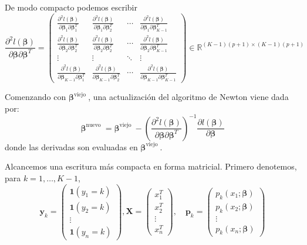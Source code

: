 \documentclass{report}
\begin{document}
  
  De modo compacto podemos escribir 
  $$
  \frac{\partial^2 l( \boldsymbol{\beta})}{\partial  \boldsymbol{\beta} \partial  \boldsymbol{\beta}^T}=\left(\begin{array}{cccc}
  	\frac{\partial^2 l( \boldsymbol{\beta})}{\partial  \boldsymbol{\beta}_1 \partial  \boldsymbol{\beta}_1^T} & \frac{\partial^2 l( \boldsymbol{\beta})}{\partial  \boldsymbol{\beta}_1 \partial  \boldsymbol{\beta}_2^T} & \cdots & \frac{\partial^2 l( \boldsymbol{\beta})}{\partial  \boldsymbol{\beta}_1 \partial  \boldsymbol{\beta}_{K-1}^T} \\
  	\frac{\partial^2 l( \boldsymbol{\beta})}{\partial  \boldsymbol{\beta}_2 \partial  \boldsymbol{\beta}_2^T} & \frac{\partial^2 l( \boldsymbol{\beta})}{\partial  \boldsymbol{\beta}_2 \partial  \boldsymbol{\beta}_2^T} & \cdots & \frac{\partial^2 l( \boldsymbol{\beta})}{\partial  \boldsymbol{\beta}_2 \partial  \boldsymbol{\beta}_{K-1}^T} \\
  	\vdots & \vdots & \ddots & \vdots \\
  	\frac{\partial^2 l( \boldsymbol{\beta})}{\partial  \boldsymbol{\beta}_{K-1} \partial  \boldsymbol{\beta}_1^T} & \frac{\partial^2 l( \boldsymbol{\beta})}{\partial  \boldsymbol{\beta}_{K-1} \partial  \boldsymbol{\beta}_2^T} & \cdots & \frac{\partial^2 l( \boldsymbol{\beta})}{\partial  \boldsymbol{\beta}_{K-1} \partial  \boldsymbol{\beta}_{K-1}^T}
  \end{array}\right) \in \mathbb{R}^{(K-1)(p+1) \times(K-1)(p+1)}
  $$
  
  
  Comenzando con $ \boldsymbol{\beta}^{\text {viejo }}$, una actualización del algoritmo de Newton viene dada por:
  $$
  \boldsymbol{\beta}^{\text {nuevo }}= \boldsymbol{\beta}^{\text {viejo }}-\left(\frac{\partial^2 l( \boldsymbol{\beta})}{\partial  \boldsymbol{\beta} \partial  \boldsymbol{\beta}^T}\right)^{-1} \frac{\partial l( \boldsymbol{\beta})}{\partial  \boldsymbol{\beta}}
  $$
  donde las derivadas  son evaluadas en $ \boldsymbol{\beta}^{\text {viejo }}$. 
  
  
  Alcancemos una escritura más compacta en forma matricial. Primero denotemos, para $k=1, \ldots, K-1$,
  $$
  \mathbf{y}_k=\left(\begin{array}{c}
  	\mathbf{1}\left(y_1=k\right) \\
  	\mathbf{1}\left(y_2=k\right) \\
  	\vdots \\
  	\mathbf{1}\left(y_n=k\right)
  \end{array}\right), \mathbf{X}=\left(\begin{array}{c}
  	x_1^T \\
  	x_2^T \\
  	\vdots \\
  	x_n^T
  \end{array}\right), \quad \mathbf{p}_k=\left(\begin{array}{c}
  	p_k\left(x_1 ;  \boldsymbol{\beta}\right) \\
  	p_k\left(x_2 ;  \boldsymbol{\beta}\right) \\
  	\vdots \\
  	p_k\left(x_n ;  \boldsymbol{\beta}\right)
  \end{array}\right)
  $$
  
\end{document}
